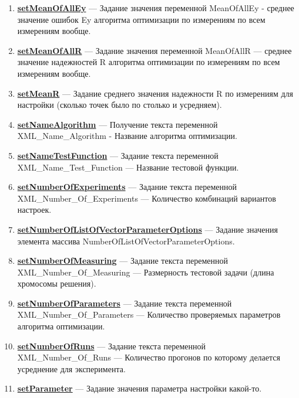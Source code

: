 \documentclass[a4paper,12pt]{article}
\begin{document}
\begin{enumerate}
\item \textbf{\hyperref[setMeanOfAllEy]{setMeanOfAllEy}} --- Задание значения переменной MeanOfAllEy - среднее значение ошибок Ey алгоритма оптимизации по измерениям по всем измерениям вообще.

\item \textbf{\hyperref[setMeanOfAllR]{setMeanOfAllR}} --- Задание значения переменной MeanOfAllR --- среднее значение надежностей R алгоритма оптимизации по измерениям по всем измерениям вообще.

\item \textbf{\hyperref[setMeanR]{setMeanR}} --- Задание среднего значения надежности R по измерениям для настройки (сколько точек было по столько и усредняем).

\item \textbf{\hyperref[setNameAlgorithm]{setNameAlgorithm}} --- Получение текста переменной  XML\_Name\_Algorithm - Название алгоритма оптимизации.

\item \textbf{\hyperref[setNameTestFunction]{setNameTestFunction}} --- Задание текста переменной  XML\_Name\_Test\_Function --- Название тестовой функции.

\item \textbf{\hyperref[setNumberOfExperiments]{setNumberOfExperiments}} --- Задание текста переменной  XML\_Number\_Of\_Experiments --- Количество комбинаций вариантов настроек.

\item \textbf{\hyperref[setNumberOfListOfVectorParameterOptions]{setNumberOfListOfVectorParameterOptions}} --- Задание значения элемента массива NumberOfListOfVectorParameterOptions.

\item \textbf{\hyperref[setNumberOfMeasuring]{setNumberOfMeasuring}} --- Задание текста переменной  XML\_Number\_Of\_Measuring --- Размерность тестовой задачи (длина хромосомы решения).

\item \textbf{\hyperref[setNumberOfParameters]{setNumberOfParameters}} --- Задание текста переменной  XML\_Number\_Of\_Parameters --- Количество проверяемых параметров алгоритма оптимизации.

\item \textbf{\hyperref[setNumberOfRuns]{setNumberOfRuns}} --- Задание текста переменной  XML\_Number\_Of\_Runs --- Количество прогонов по которому делается усреднение для эксперимента.

\item \textbf{\hyperref[setParameter]{setParameter}} --- Задание значения параметра настройки какой-то.


\end{enumerate}
\end{document}
